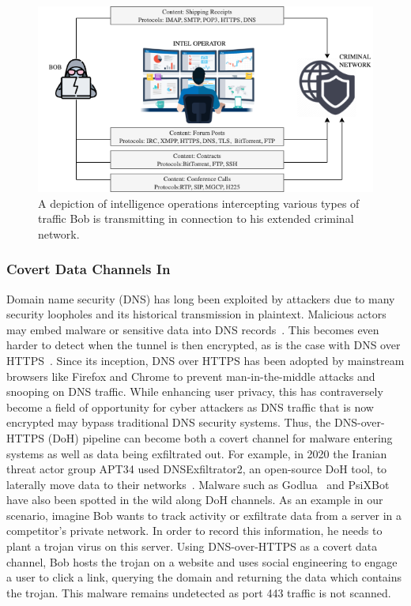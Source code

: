 \begin{figure} [ht!]
\includegraphics[width=\linewidth]{chapters/7/img/attackscenarios.drawio.png}
\caption{A depiction of intelligence operations intercepting various types of traffic Bob is transmitting in connection to his extended criminal network.}
\label{fig:attacks}
\end{figure}

\subsubsection{Covert Data Channels In}
Domain name security (DNS) has long been exploited by attackers due to many security loopholes and its historical transmission in plaintext. Malicious actors may embed malware or sensitive data into DNS records~\cite{iscx-doh-paper}. This becomes even harder to detect when the tunnel is then encrypted, as is the case with DNS over HTTPS~\cite{rfc8484}. Since its inception, DNS over HTTPS has been adopted by mainstream browsers like Firefox and Chrome to prevent man-in-the-middle attacks and snooping on DNS traffic. While enhancing user privacy, this has contraversely become a field of opportunity for cyber attackers as DNS traffic that is now encrypted may bypass traditional DNS security systems. Thus, the DNS-over-HTTPS (DoH) pipeline can become both a covert channel for malware entering systems as well as data being exfiltrated out. For example, in 2020 the Iranian threat actor group APT34 used DNSExfiltrator2, an open-source DoH tool, to laterally move data to their networks~\cite{quointelligence-apt34}. Malware such as Godlua~\cite{trendmicro-godlua} and PsiXBot~\cite{proofpoint} have also been spotted in the wild along DoH channels. As an example in our scenario, imagine Bob wants to track activity or exfiltrate data from a server in a competitor's private network. In order to record this information, he needs to plant a trojan virus on this server. Using DNS-over-HTTPS as a covert data channel, Bob hosts the trojan on a website and uses social engineering to engage a user to click a link, querying the domain and returning the data which contains the trojan. This malware remains undetected as port 443 traffic is not scanned.

